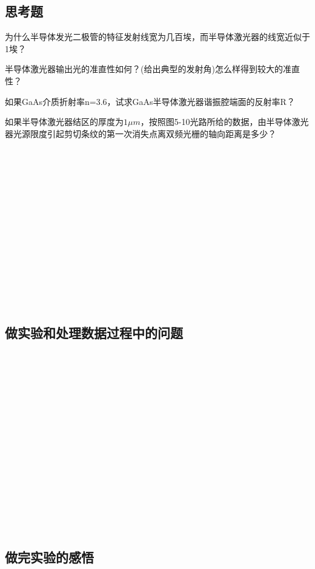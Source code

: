 \documentclass{zjureport}
\begin{document}
 \subsection{思考题}
 \begin{clause}
 	\item 为什么半导体发光二极管的特征发射线宽为几百埃，而半导体激光器的线宽近似于1埃？\\
 	\item 半导体激光器输出光的准直性如何？(给出典型的发射角)怎么样得到较大的准直性？
 	\item 如果GaAs介质折射率n=3.6，试求GaAs半导体激光器谐振腔端面的反射率R？
 	\item 如果半导体激光器结区的厚度为$1\mu m$，按照图5-10光路所给的数据，由半导体激光器光源限度引起剪切条纹的第一次消失点离双频光栅的轴向距离是多少？
 	~\\
 	~\\
 	~\\
 	~\\
 	~\\
 	~\\
 	~\\
 	~\\
 	~\\
 	~\\
 	~\\
 	~\\
 	~\\
 	~\\
 	~\\
 \end{clause}
 \subsection{做实验和处理数据过程中的问题}
	~\\
~\\
~\\
~\\
~\\
~\\
~\\
~\\
~\\
~\\
~\\
~\\
~\\
~\\
~\\
  \subsection{做完实验的感悟}
 	~\\
 	~\\
 	~\\
 	~\\
 	~\\
 	~\\
 	~\\
 	~\\
 	~\\
 	~\\
 	~\\
 	~\\
 	~\\
 	~\\
 	~\\
\end{document}
